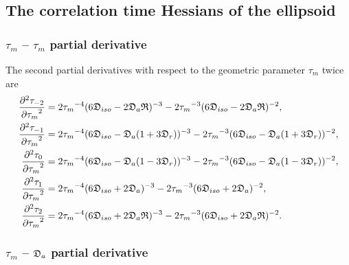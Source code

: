 
\newpage
\subsection{The correlation time Hessians of the ellipsoid}


\subsubsection{$\tau_m$ -- $\tau_m$ partial derivative}

The second partial derivatives with respect to the geometric parameter $\tau_m$ twice are
\begin{subequations}
\begin{align}
    \frac{\partial^2 \tau_{-2}}{{\partial \tau_m}^2} &= 2{\tau_m}^{-4} (6\mathfrak{D}_{iso} - 2\mathfrak{D}_a\mathfrak{R})^{-3}
        - 2{\tau_m}^{-3} (6\mathfrak{D}_{iso} - 2\mathfrak{D}_a\mathfrak{R})^{-2}, \\
    \frac{\partial^2 \tau_{-1}}{{\partial \tau_m}^2} &= 2{\tau_m}^{-4} (6\mathfrak{D}_{iso} - \mathfrak{D}_a (1 + 3\mathfrak{D}_r))^{-3}
        - 2{\tau_m}^{-3} (6\mathfrak{D}_{iso} - \mathfrak{D}_a (1 + 3\mathfrak{D}_r))^{-2}, \\
    \frac{\partial^2 \tau_{0}}{{\partial \tau_m}^2}  &= 2{\tau_m}^{-4} (6\mathfrak{D}_{iso} - \mathfrak{D}_a (1 - 3\mathfrak{D}_r))^{-3}
        - 2{\tau_m}^{-3} (6\mathfrak{D}_{iso} - \mathfrak{D}_a (1 - 3\mathfrak{D}_r))^{-2}, \\
    \frac{\partial^2 \tau_{1}}{{\partial \tau_m}^2}  &= 2{\tau_m}^{-4} (6\mathfrak{D}_{iso} + 2\mathfrak{D}_a)^{-3}
        - 2{\tau_m}^{-3} (6\mathfrak{D}_{iso} + 2\mathfrak{D}_a)^{-2}, \\
    \frac{\partial^2 \tau_{2}}{{\partial \tau_m}^2}  &= 2{\tau_m}^{-4} (6\mathfrak{D}_{iso} + 2\mathfrak{D}_a\mathfrak{R})^{-3}
        - 2{\tau_m}^{-3} (6\mathfrak{D}_{iso} + 2\mathfrak{D}_a\mathfrak{R})^{-2}.
\end{align}
\end{subequations}



\subsubsection{$\tau_m$ -- $\mathfrak{D}_a$ partial derivative}

